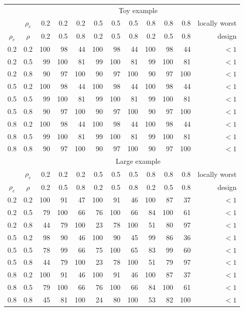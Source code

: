\documentclass[12pt]{article}
\begin{document}
{\footnotesize
\vspace{.05in}
\begin{center}
\begin{tabular}{|cc|rrrrrrrrrr|}
\hline
&& \multicolumn{10}{c|}{Toy example}  \\
           & $\rho_{c}$ &  0.2 & 0.2 & 0.2 & 0.5 & 0.5 & 0.5 & 0.8 & 0.8 & 0.8 & locally worst \\
$\rho_{c}$ & $\rho$     &  0.2 & 0.5 & 0.8 & 0.2 & 0.5 & 0.8 & 0.2 & 0.5 & 0.8 & design \\
\hline
0.2 & 0.2 & 100 & 98 & 44 & 100 & 98 & 44 & 100 & 98 & 44 & $<1$ \\
0.2 & 0.5 & 99 & 100 & 81 & 99 & 100 & 81 & 99 & 100 & 81 & $<1$ \\
0.2 & 0.8 & 90 & 97 & 100 & 90 & 97 & 100 & 90 & 97 & 100 & $<1$ \\
0.5 & 0.2 & 100 & 98 & 44 & 100 & 98 & 44 & 100 & 98 & 44 & $<1$ \\
0.5 & 0.5 & 99 & 100 & 81 & 99 & 100 & 81 & 99 & 100 & 81 & $<1$ \\
0.5 & 0.8 & 90 & 97 & 100 & 90 & 97 & 100 & 90 & 97 & 100 & $<1$ \\
0.8 & 0.2 & 100 & 98 & 44 & 100 & 98 & 44 & 100 & 98 & 44 & $<1$ \\
0.8 & 0.5 & 99 & 100 & 81 & 99 & 100 & 81 & 99 & 100 & 81 & $<1$ \\
0.8 & 0.8 & 90 & 97 & 100 & 90 & 97 & 100 & 90 & 97 & 100 & $<1$ \\
\hline
&& \multicolumn{10}{c|}{Large example} \\
           & $\rho_{c}$ &  0.2 & 0.2 & 0.2 & 0.5 & 0.5 & 0.5 & 0.8 & 0.8 & 0.8 & locally worst \\
$\rho_{c}$ & $\rho$     &  0.2 & 0.5 & 0.8 & 0.2 & 0.5 & 0.8 & 0.2 & 0.5 & 0.8 & design \\
\hline
0.2 & 0.2 & 100 & 91  & 47  & 100 & 91  & 46  & 100 & 87  & 37    & $<1$\\
0.2 & 0.5 & 79  & 100 & 66  & 76  & 100 & 66  & 84  & 100 & 61    & $<1$\\
0.2 & 0.8 & 44  & 79  & 100 & 23  & 78  & 100 & 51  & 80  & 97    & $<1$\\
0.5 & 0.2 & 98  & 90  & 46  & 100 & 90  & 45  & 99  & 86  & 36    &  $<1$\\
0.5 & 0.5 & 78  & 99  & 66  & 75  & 100 & 65  & 83  & 99  & 60    & $<1$\\
0.5 & 0.8 & 44  & 79  & 100 & 23  & 78  & 100 & 51  & 79  & 97    & $<1$\\
0.8 & 0.2 & 100 & 91  & 46  & 100 & 91  & 46  & 100 & 87  & 37    & $<1$\\
0.8 & 0.5 & 79  & 100 & 66  & 76  & 100 & 66  & 84  & 100 & 61    & $<1$\\
0.8 & 0.8 & 45  & 81  & 100 & 24  & 80  & 100 & 53  & 82  & 100   & $<1$\\
\hline
\end{tabular}
\end{center}}
\end{document}
